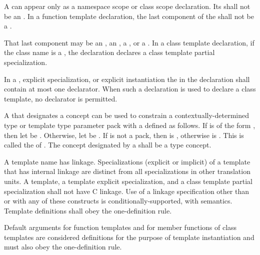 \pnum
A
can appear only as a namespace scope or class scope declaration.
Its  shall not be an
.
In a function template declaration, the last component of the
shall not be a
.
\begin{note}
That last component may be an , an ,
a , or a . In
a class template declaration, if the
class name
is a
,
the declaration declares a class template partial specialization.
\end{note}

\pnum
In a
,
explicit specialization, or explicit instantiation the
in the declaration shall contain at most one declarator.
When such a declaration is used to declare a class template,
no declarator is permitted.

\pnum
A   that designates a concept 
can be used to constrain a
contextually-determined type or template type parameter pack 
with a   defined as follows.
If  is of the form ,
then let  be .
Otherwise, let  be .
If  is not a pack,
then  is ,
otherwise  is .
This   is called the
of .
The concept designated by a 
shall be a type concept.

\pnum
{}%
A template name has linkage.
Specializations (explicit or implicit) of
a template that has internal linkage are
distinct from all specializations in other translation
units.
A template, a template explicit specialization, and a class
template partial specialization shall not have C linkage. Use of a linkage specification
other than  or  with any of these constructs is
conditionally-supported, with
 semantics.
Template definitions shall obey the one-definition rule.
\begin{note}
Default arguments for function templates and for member functions of
class templates are considered definitions for the purpose of template
instantiation and must also obey the one-definition rule.
\end{note}

